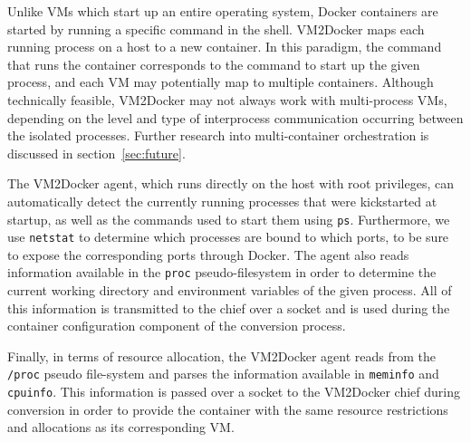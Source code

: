 Unlike VMs which start up an entire operating system, Docker containers are started by running a specific command in the shell. VM2Docker maps each running process on a host to a new container. In this paradigm, the command that runs the container corresponds to the command to start up the given process, and each VM may potentially map to multiple containers. Although technically feasible, VM2Docker may not always work with multi-process VMs, depending on the level and type of interprocess communication occurring between the isolated processes. Further research into multi-container orchestration is discussed in section~\ref{sec:future}.

The VM2Docker agent, which runs directly on the host with root privileges, can automatically detect the currently running processes that were kickstarted at startup, as well as the commands used to start them using \texttt{ps}. Furthermore, we use \texttt{netstat} to determine which processes are bound to which ports, to be sure to expose the corresponding ports through Docker. The agent also reads information available in the \texttt{proc} pseudo-filesystem in order to determine the current working directory and environment variables of the given process. All of this information is transmitted to the chief over a socket and is used during the container configuration component of the conversion process.

Finally, in terms of resource allocation, the VM2Docker agent reads from the \texttt{/proc} pseudo file-system and parses the information available in \texttt{meminfo} and \texttt{cpuinfo}. This information is passed over a socket to the VM2Docker chief during conversion in order to provide the container with the same resource restrictions and allocations as its corresponding VM.

